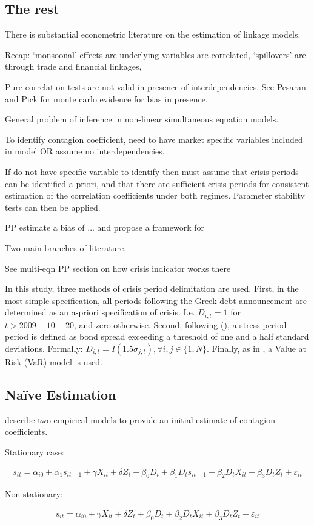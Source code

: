 \documentclass[../base.tex]{subfiles}
\begin{document}
\subsection{The rest}






There is substantial econometric literature on the estimation of linkage models. 

Recap: `monsoonal' effects are underlying variables are correlated, `spillovers' are through trade and financial linkages, 

Pure correlation tests are not valid in presence of interdependencies. See Pesaran and Pick for monte carlo evidence for bias in presence. 

General problem of inference in non-linear simultaneous equation models. 

To identify contagion coefficient, need to have market specific variables included in model OR assume no interdependencies.

If do not have specific variable to identify then must assume that crisis periods can be identified a-priori, and that there are sufficient crisis periods for consistent estimation of the correlation coefficients under both regimes. Parameter stability tests can then be applied. 

PP estimate a bias of ... and propose a framework for 

Two main branches of literature. 


See multi-eqn PP section on how crisis indicator works there

In this study, three methods of crisis period delimitation are used. First, in the most simple specification, all periods following the Greek debt announcement are determined as an a-priori specification of crisis. I.e. $D_{i,t} = 1$ for $t > 2009-10-20$, and zero otherwise. Second, following (), a stress period period is defined as bond spread exceeding a threshold of one and a half standard deviations. Formally: $D_{i,t} = I(1.5\sigma_{j,t}), \forall i, j \in \{1, N\}$. Finally, as in \cite{metiu2012sovereign}, a Value at Risk (VaR) model is used. 


\subsection{Na\"{i}ve Estimation}

\cite{giordano2013pure} describe two empirical models to provide an initial estimate of contagion coefficients. 

Stationary case:

\begin{align}
	s_{it} = \alpha_{i0} + \alpha_{1}s_{it-1} +\gamma X_{it} + \delta Z_t + \beta_0D_t + \beta_1D_ts_{it-1} + \beta_2D_tX_{it} + \beta_3D_tZ_t + \varepsilon_{it}
\end{align}

Non-stationary:

\begin{align}
	s_{it} = \alpha_{i0} + \gamma X_{it} + \delta Z_t + \beta_0D_t + \beta_2D_tX_{it} + \beta_3D_tZ_t + \varepsilon_{it}
\end{align}
\end{document}
